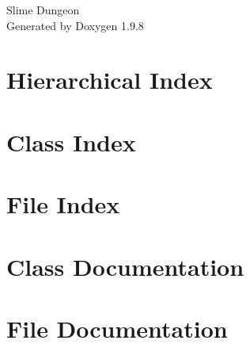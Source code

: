 \documentclass[twoside]{book}
\newcommand{\+}{\discretionary{\mbox{\scriptsize$\hookleftarrow$}}{}{}}
\newcommand{\clearemptydoublepage}{%
    \newpage{\pagestyle{empty}\cleardoublepage}%
  }
\begin{document}
  \raggedbottom
    \hypersetup{pageanchor=false,
                bookmarksnumbered=true,
                pdfencoding=unicode
               }
  \begin{titlepage}
  \vspace*{7cm}
  \begin{center}%
  {\Large Slime Dungeon}\\
  \vspace*{1cm}
  {\large Generated by Doxygen 1.9.8}\\
  \end{center}
  \end{titlepage}
  \clearemptydoublepage
  \tableofcontents
  \clearemptydoublepage
  \hypersetup{pageanchor=true}
\chapter{Hierarchical Index}

\chapter{Class Index}

\chapter{File Index}

\chapter{Class Documentation}



















\chapter{File Documentation}



















  \backmatter
  \newpage
  \clearemptydoublepage
  \printindex
\end{document}
